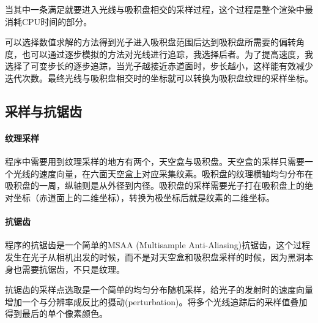 当其中一条满足就要进入光线与吸积盘相交的采样过程，这个过程是整个渲染中最消耗CPU时间的部分。

可以选择数值求解的方法得到光子进入吸积盘范围后达到吸积盘所需要的偏转角度，也可以通过逐步模拟的方法对光线进行追踪，我选择后者。为了提高速度，我选择了可变步长的逐步追踪，当光子越接近赤道面时，步长越小，这样能有效减少迭代次数。最终光线与吸积盘相交时的坐标就可以转换为吸积盘纹理的采样坐标。

\subsection{采样与抗锯齿}
\paragraph{纹理采样}程序中需要用到纹理采样的地方有两个，天空盒与吸积盘。天空盒的采样只需要一个光线的速度向量，在六面天空盒上对应采集纹素。吸积盘的纹理横轴均匀分布在吸积盘的一周，纵轴则是从外径到内径。吸积盘的采样需要光子打在吸积盘上的绝对坐标（赤道面上的二维坐标），转换为极坐标后就是纹素的二维坐标。

\paragraph{抗锯齿}
程序的抗锯齿是一个简单的MSAA (Multisample Anti-Aliasing)抗锯齿，这个过程发生在光子从相机出发的时候，而不是对天空盒和吸积盘采样的时候，因为黑洞本身也需要抗锯齿，不只是纹理。

抗锯齿的采样点选取是一个简单的均匀分布随机采样，给光子的发射时的速度向量增加一个与分辨率成反比的摄动(perturbation)。将多个光线追踪后的采样值叠加得到最后的单个像素颜色。

